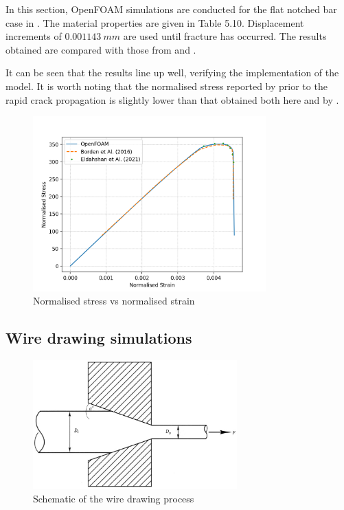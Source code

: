 \documentclass[sn-mathphys,Numbered,draft]{sn-jnl}%
\begin{document}
In this section, OpenFOAM simulations are conducted for the flat notched bar case in \citet{borden_phase-field_2016}. The material properties are given in Table 5.10. Displacement increments of $0.001143\ mm$ are used until fracture has occurred. The results obtained are compared with those from \citet{borden_phase-field_2016} and \citet{eldahshan_phase_2021}. 

It can be seen that the results line up well, verifying the implementation of the model. It is worth noting that the normalised stress reported by \citet{borden_phase-field_2016} prior to the rapid crack propagation is slightly lower than that obtained both here and by \citet{eldahshan_phase_2021}.

\begin{figure}[htb]
\begin{center}
	\includegraphics[width=0.8\textwidth]{./Figures/phaseCompare.png}
\caption{Normalised stress vs normalised strain}
\label{fig:notchedRoundBAr}
\end{center}
\end{figure}




\subsection{Wire drawing simulations}

\begin{figure}[htb]
\begin{center}
	\includegraphics[width=0.7\textwidth]{./Figures/SimulationAndAnalysis/modelCompare/drawingSchematic.png}
\caption{Schematic of the wire drawing process}
\label{fig:notchedRoundBAr}
\end{center}
\end{figure}
\end{document}

